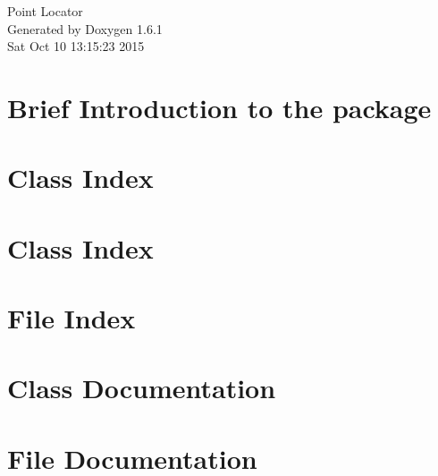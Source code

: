 \documentclass[a4paper]{book}
\begin{document}
\hypersetup{pageanchor=false}
\begin{titlepage}
\vspace*{7cm}
\begin{center}
{\Large Point Locator }\\
\vspace*{1cm}
{\large Generated by Doxygen 1.6.1}\\
\vspace*{0.5cm}
{\small Sat Oct 10 13:15:23 2015}\\
\end{center}
\end{titlepage}
\clearemptydoublepage
{}
\tableofcontents
\clearemptydoublepage
{}
\hypersetup{pageanchor=true}
\chapter{Brief Introduction to the package}
\label{index}\hypertarget{index}{}
\chapter{Class Index}

\chapter{Class Index}

\chapter{File Index}

\chapter{Class Documentation}































\chapter{File Documentation}





\printindex
\end{document}
